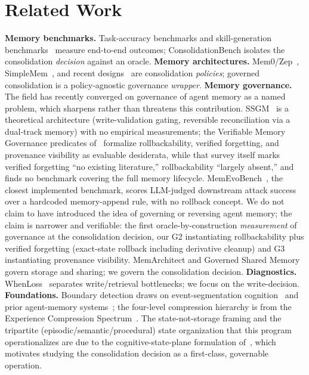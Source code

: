\documentclass[11pt]{article}
\newcommand{\bench}{ConsolidationBench}
\begin{document}
\section{Related Work}
\textbf{Memory benchmarks.} Task-accuracy benchmarks
\cite{longmemeval,amabench,memoryagentbench,memoryarena,beam,locomo} and
skill-generation benchmarks~\cite{skillgenbench} measure end-to-end outcomes;
\bench{} isolates the consolidation \emph{decision} against an oracle. \textbf{Memory
architectures.} Mem0/Zep~\cite{mem0,zep}, SimpleMem~\cite{simplemem}, and
recent designs~\cite{recmem,amem,timem,atommem,memskill} are consolidation
\emph{policies}; governed consolidation is a policy-agnostic governance \emph{wrapper}.
\textbf{Memory governance.} The field has recently converged on governance of agent
memory as a named problem, which sharpens rather than threatens this contribution.
SSGM~\cite{ssgm} is a theoretical architecture (write-validation gating, reversible
reconciliation via a dual-track memory) with no empirical measurements; the
Verifiable Memory Governance predicates of~\cite{memsec} formalize rollbackability,
verified forgetting, and provenance visibility as evaluable desiderata, while that
survey itself marks verified forgetting ``no existing literature,'' rollbackability
``largely absent,'' and finds no benchmark covering the full memory lifecycle.
MemEvoBench~\cite{memevobench}, the closest implemented benchmark, scores
LLM-judged downstream attack success over a hardcoded memory-append rule, with no
rollback concept. We do not claim to have introduced the idea of governing or
reversing agent memory; the claim is narrower and verifiable: the first
oracle-by-construction \emph{measurement} of governance at the consolidation
decision, our G2 instantiating rollbackability plus verified forgetting (exact-state
rollback including derivative cleanup) and G3 instantiating provenance visibility.
MemArchitect and Governed Shared Memory~\cite{memarchitect,memclaw} govern storage
and sharing; we govern the consolidation decision. \textbf{Diagnostics.} WhenLoss~\cite{whenloss} separates write/retrieval
bottlenecks; we focus on the write-decision. \textbf{Foundations.} Boundary detection
draws on event-segmentation cognition~\cite{zacks,tulving,schacter} and prior
agent-memory systems~\cite{emllm,genagents,hipporag}; the four-level compression
hierarchy is from the Experience Compression Spectrum~\cite{compspectrum,externalization}.
The state-not-storage framing and the tripartite (episodic/semantic/procedural) state
organization that this program operationalizes are due to the cognitive-state-plane
formulation of~\cite{stateplane}, which motivates studying the consolidation decision
as a first-class, governable operation.
\end{document}
